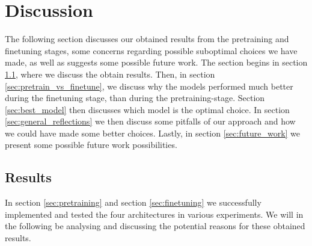 \documentclass[./main.tex]{subfiles}
\begin{document}
\section{Discussion}
\label{sec:discussion}
The following section discusses our obtained results from the pretraining and finetuning stages, some concerns regarding possible suboptimal choices we have made, as well as suggests some possible future work. The section begins in section \ref{sec:results}, where we discuss the obtain results. Then, in section \ref{sec:pretrain_vs_finetune}, we discuss why the models performed much better during the finetuning stage, than during the pretraining-stage. Section \ref{sec:best_model} then discusses which model is the optimal choice. In section \ref{sec:general_reflections} we then discuss some pitfalls of our approach and how we could have made some better choices. Lastly, in section \ref{sec:future_work} we present some possible future work possibilities.

\subsection{Results}
\label{sec:results}
In section \ref{sec:pretraining} and section \ref{sec:finetuning} we successfully implemented and tested the four architectures in various experiments. We will in the following be analysing and discussing the potential reasons for these obtained results.
\end{document}
